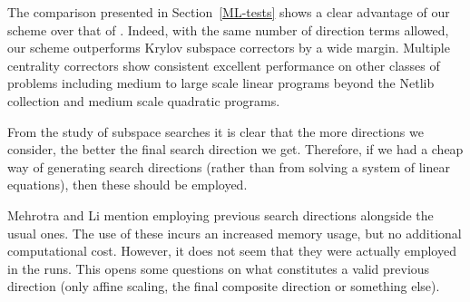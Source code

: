 The comparison presented in Section~\ref{ML-tests} shows a clear advantage 
of our scheme over that of \cite{MehrotraLi}. Indeed, with the same 
number of direction terms allowed, our scheme outperforms Krylov subspace 
correctors by a wide margin. Multiple centrality correctors show 
consistent excellent performance on other classes of problems
including medium to large scale linear programs beyond the Netlib 
collection and medium scale quadratic programs.




\begin{remark}
From the study of subspace searches it is clear that the more 
directions we consider, the better the final search direction 
we get. Therefore, if we had a cheap way of generating search
directions (rather than from solving a system of linear equations),
then these should be employed.
\end{remark}

\begin{remark}
Mehrotra and Li \cite{MehrotraLi} mention employing previous search
directions alongside the usual ones. The use of these incurs an
increased memory usage, but no additional computational cost.
However, it does not seem that they were actually employed in
the runs. This opens some questions on what constitutes a valid
previous direction (only affine scaling, the final composite direction
or something else).
\end{remark}
